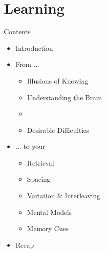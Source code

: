 \documentclass{ercisbeamer}
\begin{document}
\section{Learning}
\begin{frame}{Contents}
    \begin{itemize}
        \item Introduction
        \item From ...
        \begin{itemize}
            \item Illusions of Knowing
            \item Understanding the Brain
            \item {}
            \item Desirable Difficulties
        \end{itemize}
        \item ... to your 
        \begin{itemize}
            \item Retrieval
            \item Spacing
            \item Variation \& Interleaving
            \item Mental Models
            \item Memory Cues
        \end{itemize}
        \item Recap
    \end{itemize}
\end{frame}
\end{document}
